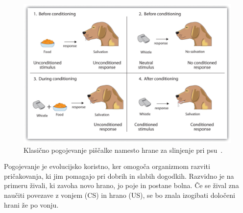\documentclass[a4paper, oneside, 12pt]{report}
\begin{document}
\begin{figure}[htbp]
\includegraphics[scale=0.226]{WhistleAndDog.jpg}
\caption{Klasično pogojevanje piščalke namesto hrane za slinjenje pri psu~\cite{IntroductionToPsychology}.}
\label{figure:WhistleAndDog}
\end{figure}

Pogojevanje je evolucijsko koristno, ker omogoča organizmom razviti pričakovanja, ki jim pomagajo pri dobrih in slabih dogodkih. Razvidno je na primeru živali, ki zavoha novo hrano, jo poje in postane bolna. Če se žival zna naučiti povezave z vonjem (CS) in hrano (US), se bo znala izogibati določeni hrani že po vonju.


\end{document}
